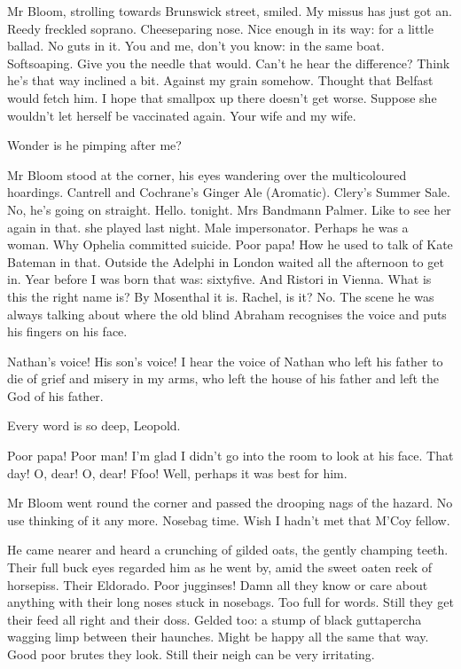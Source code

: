Mr Bloom, strolling towards Brunswick street, smiled.
My missus has just got an.
Reedy freckled soprano.
Cheeseparing nose.
Nice enough in its way: for a little ballad.
No guts in it.
You and me, don't you know:
in the same boat.
Softsoaping.
Give you the needle that would.
Can't he hear the difference?
Think he's that way inclined a bit.
Against my grain somehow.
Thought that Belfast would fetch him.
I hope that smallpox up there doesn't get worse.
Suppose she wouldn't let herself be vaccinated again.
Your wife and my wife.

Wonder is he pimping after me?

Mr Bloom stood at the corner,
his eyes wandering over the multicoloured hoardings.
Cantrell and Cochrane's Ginger Ale (Aromatic).
Clery's Summer Sale.
No, he's going on straight.
Hello.
 tonight.
Mrs Bandmann Palmer.
Like to see her again in that.
 she played last night.
Male impersonator.
Perhaps he was a woman.
Why Ophelia committed suicide.
Poor papa!
How he used to talk of Kate Bateman in that.
Outside the Adelphi in London
waited all the afternoon to get in.
Year before I was born
that was:
sixtyfive.
And Ristori in Vienna.
What is this the right name is?
By Mosenthal it is.
Rachel, is it?
No.
The scene he was always talking about
where the old blind Abraham recognises the voice
and puts his fingers on his face.

Nathan's voice!
His son's voice!
I hear the voice of Nathan who left his father
to die of grief and misery in my arms,
who left the house of his father
and left the God of his father.

Every word is so deep, Leopold.

Poor papa!
Poor man!
I'm glad I didn't go into the room to look at his face.
That day!
O, dear!
O, dear!
Ffoo!
Well, perhaps it was best for him.

Mr Bloom went round the corner
and passed the drooping nags of the hazard.
No use thinking of it any more.
Nosebag time.
Wish I hadn't met that M'Coy fellow.

He came nearer and heard a crunching of gilded oats,
the gently champing teeth.
Their full buck eyes regarded him as he went by,
amid the sweet oaten reek of horsepiss.
Their Eldorado.
Poor jugginses!
Damn all they know or care about anything
with their long noses stuck in nosebags.
Too full for words.
Still they get their feed all right and their doss.
Gelded too:
a stump of black guttapercha wagging limp between their haunches.
Might be happy all the same that way.
Good poor brutes they look.
Still their neigh can be very irritating.

